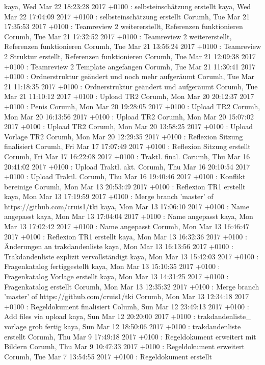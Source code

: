 kaya, Wed Mar 22 18:23:28 2017 +0100 : selbsteinschätzung erstellt
kaya, Wed Mar 22 17:04:09 2017 +0100 : selbsteinschätzung erstellt
Corumh, Tue Mar 21 17:35:53 2017 +0100 : Teamreview 2 weitererstellt, Referenzen funktionieren
Corumh, Tue Mar 21 17:32:52 2017 +0100 : Teamreview 2 weitererstellt, Referenzen funktionieren
Corumh, Tue Mar 21 13:56:24 2017 +0100 : Teamreview 2 Struktur erstellt, Referenzen funktionieren
Corumh, Tue Mar 21 12:09:38 2017 +0100 : Teamreview 2 Template angefangen
Corumh, Tue Mar 21 11:30:41 2017 +0100 : Ordnerstruktur geändert und noch mehr aufgeräumt
Corumh, Tue Mar 21 11:18:35 2017 +0100 : Ordnerstruktur geändert und aufgeräumt
Corumh, Tue Mar 21 11:10:12 2017 +0100 : Upload TR2
Corumh, Mon Mar 20 20:12:37 2017 +0100 : Penis
Corumh, Mon Mar 20 19:28:05 2017 +0100 : Upload TR2
Corumh, Mon Mar 20 16:13:56 2017 +0100 : Upload TR2
Corumh, Mon Mar 20 15:07:02 2017 +0100 : Upload TR2
Corumh, Mon Mar 20 13:58:25 2017 +0100 : Upload Vorlage TR2
Corumh, Mon Mar 20 12:29:35 2017 +0100 : Reflexion Sitzung finalisiert
Corumh, Fri Mar 17 17:07:49 2017 +0100 : Reflexion Sitzung erstellt
Corumh, Fri Mar 17 16:22:08 2017 +0100 : Traktl. final.
Corumh, Thu Mar 16 20:41:02 2017 +0100 : Upload Traktl. akt.
Corumh, Thu Mar 16 20:10:54 2017 +0100 : Upload Traktl.
Corumh, Thu Mar 16 19:40:46 2017 +0100 : Konflikt bereinige
Corumh, Mon Mar 13 20:53:49 2017 +0100 : Reflexion TR1 erstellt
kaya, Mon Mar 13 17:19:59 2017 +0100 : Merge branch 'master' of https://github.com/cruis1/tki
kaya, Mon Mar 13 17:06:10 2017 +0100 : Name angepasst
kaya, Mon Mar 13 17:04:04 2017 +0100 : Name angepasst
kaya, Mon Mar 13 17:02:42 2017 +0100 : Name angepasst
Corumh, Mon Mar 13 16:46:47 2017 +0100 : Reflexion TR1 erstellt
kaya, Mon Mar 13 16:32:36 2017 +0100 : Änderungen an trakdandenliste
kaya, Mon Mar 13 16:13:56 2017 +0100 : Trakdandenliste explizit vervollständigt
kaya, Mon Mar 13 15:42:03 2017 +0100 : Fragenkatalog fertiggestellt
kaya, Mon Mar 13 15:10:35 2017 +0100 : Fragenkatalog Vorlage erstellt
kaya, Mon Mar 13 14:31:25 2017 +0100 : Fragenkatalog erstellt
Corumh, Mon Mar 13 12:35:32 2017 +0100 : Merge branch 'master' of https://github.com/cruis1/tki
Corumh, Mon Mar 13 12:34:18 2017 +0100 : Regeldokument finalisiert
Columh, Sun Mar 12 23:49:13 2017 +0100 : Add files via upload
kaya, Sun Mar 12 20:20:00 2017 +0100 : trakdandenliste\_ vorlage grob fertig
kaya, Sun Mar 12 18:50:06 2017 +0100 : trakdandenliste erstellt
Corumh, Thu Mar 9 17:49:18 2017 +0100 : Regeldokument erweitert mit Bildern
Corumh, Thu Mar 9 10:47:33 2017 +0100 : Regeldokument erweitert
Corumh, Tue Mar 7 13:54:55 2017 +0100 : Regeldokument erstellt

